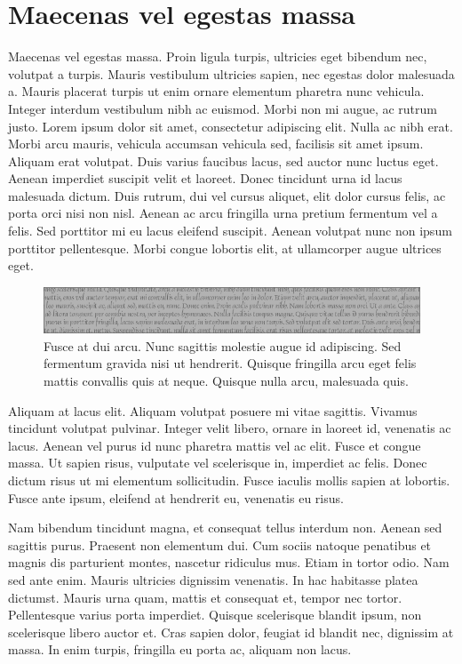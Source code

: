 \section{Maecenas vel egestas massa}
Maecenas vel egestas massa.
Proin ligula turpis, ultricies eget bibendum nec, volutpat a turpis.
Mauris vestibulum ultricies sapien, nec egestas dolor malesuada a.
Mauris placerat turpis ut enim ornare elementum pharetra nunc vehicula.
Integer interdum vestibulum nibh ac euismod.
Morbi non mi augue, ac rutrum justo.
Lorem ipsum dolor sit amet, consectetur adipiscing elit.
Nulla ac nibh erat.
Morbi arcu mauris, vehicula accumsan vehicula sed, facilisis sit amet ipsum.
Aliquam erat volutpat.
Duis varius faucibus lacus, sed auctor nunc luctus eget.
Aenean imperdiet suscipit velit et laoreet.
Donec tincidunt urna id lacus malesuada dictum.
Duis rutrum, dui vel cursus aliquet, elit dolor cursus felis, ac porta orci nisi non nisl.
Aenean ac arcu fringilla urna pretium fermentum vel a felis.
Sed porttitor mi eu lacus eleifend suscipit.
Aenean volutpat nunc non ipsum porttitor pellentesque.
Morbi congue lobortis elit, at ullamcorper augue ultrices eget.

\begin{figure}[!t]
  \centering
  \includegraphics[width=\linewidth]{figs/leaderboard-gray}
  \caption[Fusce at dui arcu]{
    Fusce at dui arcu.
Nunc sagittis molestie augue id adipiscing.
Sed fermentum gravida nisi ut hendrerit.
Quisque fringilla arcu eget felis mattis convallis quis at neque.
Quisque nulla arcu, malesuada quis.
  }
\end{figure}

Aliquam at lacus elit.
Aliquam volutpat posuere mi vitae sagittis.
Vivamus tincidunt volutpat pulvinar.
Integer velit libero, ornare in laoreet id, venenatis ac lacus.
Aenean vel purus id nunc pharetra mattis vel ac elit.
Fusce et congue massa.
Ut sapien risus, vulputate vel scelerisque in, imperdiet ac felis.
Donec dictum risus ut mi elementum sollicitudin.
Fusce iaculis mollis sapien at lobortis.
Fusce ante ipsum, eleifend at hendrerit eu, venenatis eu risus.

Nam bibendum tincidunt magna, et consequat tellus interdum non.
Aenean sed sagittis purus.
Praesent non elementum dui.
Cum sociis natoque penatibus et magnis dis parturient montes, nascetur ridiculus mus.
Etiam in tortor odio.
Nam sed ante enim.
Mauris ultricies dignissim venenatis.
In hac habitasse platea dictumst.
Mauris urna quam, mattis et consequat et, tempor nec tortor.
Pellentesque varius porta imperdiet.
Quisque scelerisque blandit ipsum, non scelerisque libero auctor et.
Cras sapien dolor, feugiat id blandit nec, dignissim at massa.
In enim turpis, fringilla eu porta ac, aliquam non lacus.

